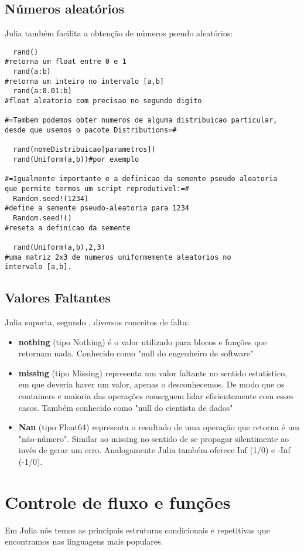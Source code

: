 \subsection{Números aleatórios}
Julia também facilita a obtenção de números pseudo aleatórios:
    \begin{lstlisting}
  rand()  
#retorna um float entre 0 e 1
  rand(a:b) 
#retorna um inteiro no intervalo [a,b]
  rand(a:0.01:b) 
#float aleatorio com precisao no segundo digito

#=Tambem podemos obter numeros de alguma distribuicao particular, 
desde que usemos o pacote Distributions=#

  rand(nomeDistribuicao[parametros])
  rand(Uniform(a,b))#por exemplo

#=Igualmente importante e a definicao da semente pseudo aleatoria
que permite termos um script reprodutivel:=#
  Random.seed!(1234) 
#define a semente pseudo-aleatoria para 1234
  Random.seed!() 
#reseta a definicao da semente

  rand(Uniform(a,b),2,3) 
#uma matriz 2x3 de numeros uniformemente aleatorios no 
intervalo [a,b].

    \end{lstlisting}
\subsection{Valores Faltantes}
Julia suporta, segundo \cite{Lobianco2019}, diversos conceitos de falta:
\begin{itemize}
    \item \textbf{nothing} (tipo Nothing) é o valor utilizado para blocos e funções que retornam nada. Conhecido como "null do engenheiro de software"
    \item \textbf{missing} (tipo Missing) representa um valor faltante no sentido estatístico, em que deveria haver um valor, apenas o desconhecemos. De modo que os containers e maioria das operações conseguem lidar eficientemente com esses casos. Também conhecido como "null do cientista de dados"
    \item \textbf{Nan} (tipo Float64) representa o resultado de uma operação que retorna é um "não-número". Similar ao missing no sentido de se propagar silentimente ao invés de gerar um erro. Analogamente Julia também oferece Inf (1/0) e -Inf (-1/0).
\end{itemize}
\section{Controle de fluxo e funções}
Em Julia nós temos as principais estruturas condicionais e repetitivas que encontramos nas linguagens mais populares. %
